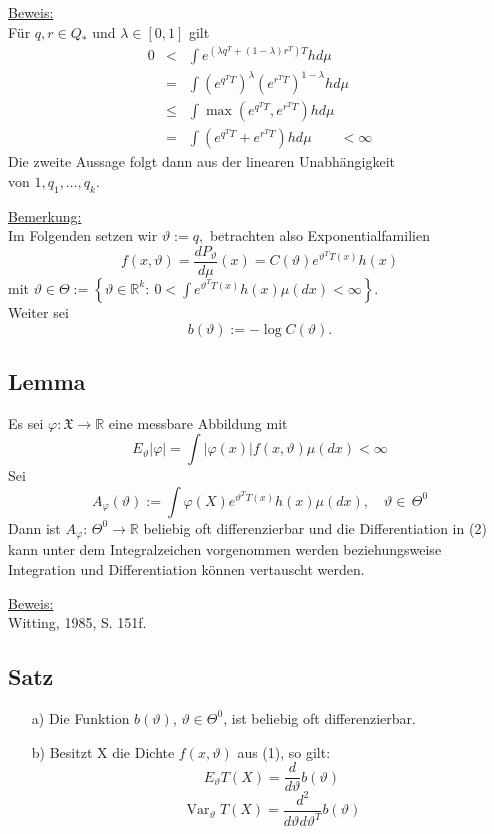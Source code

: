 \documentclass[a4paper,11pt,twoside,titlepage]{article}
\newcommand{\R}{{\mathbb R}}
\newcommand{\XX}{{\mathfrak X}} %
\DeclareMathOperator{\var}{Var}
\begin{document}
\underline{Beweis:}\\
F\"ur $q,r\in Q_*$ und $\lambda\in[0,1]$ gilt
\begin{eqnarray*}
  0 &<& \int e^{(\lambda q^{T} +(1-\lambda)r^{T} )T} h d\mu
   \\&=& \int \left( e^{q^{T}  T} \right)^\lambda \left(e^{r^{T}  T} \right)^{1-\lambda} h d\mu \\
   &\leq& \int \max\left( e^{q^{T}  T}, e^{r^{T} T} \right) h d\mu
   \\&=& \int \left( e^{q^{T}  T}+ e^{r^{T} T} \right) h d\mu  \qquad<\infty
\end{eqnarray*}
Die zweite Aussage folgt dann aus der linearen Unabhängigkeit\\ von $1,q_1,\ldots,q_k.$

\underline{Bemerkung:}\\
Im Folgenden setzen wir $\vartheta:=q,$ betrachten also Exponentialfamilien
\begin{equation}
f(x,\vartheta)=\frac{d P_\vartheta}{d\mu}(x)= C(\vartheta)
e^{\vartheta^{T}  T(x)} h(x)
\end{equation}
mit
$\vartheta\in\Theta:= \left\{\vartheta\in\R^k:~ 0<\int e^{\vartheta^{T} T(x)} h(x) \mu(dx) <\infty \right\}.$\\ Weiter sei
$$b(\vartheta):=-\log C(\vartheta). $$

\subsection{Lemma}
Es sei $\varphi:\XX\rightarrow \R$ eine messbare Abbildung mit
$$ E_\vartheta|\varphi|=\int |\varphi(x)| f(x,\vartheta) \mu(dx)<\infty$$
Sei
\begin{equation}
A_\varphi(\vartheta):=\int \varphi(X) e^{\vartheta^{T} T(x)} h(x) \mu(dx), \quad \vartheta\in \, \Theta^0
\end{equation}
Dann ist $A_\varphi: \, \Theta^0\rightarrow\R$ beliebig oft differenzierbar und die Differentiation in (2)  kann unter dem Integralzeichen vorgenommen werden beziehungsweise Integration und Differentiation k\"onnen vertauscht werden.

\underline{Beweis:}\\
Witting, 1985, S. 151f.

\subsection{Satz}
\begin{itemize}
\item[a) ]Die Funktion $b(\vartheta)$, $\vartheta\in\Theta^0$, ist beliebig oft differenzierbar.
\item[b) ]Besitzt X die Dichte $f(x,\vartheta)$ aus (1), so gilt:
\[E_\vartheta T(X)=\frac{d}{d\vartheta}b(\vartheta)\]
\[\var_\vartheta T(X)=\frac{d^2}{d\vartheta d\vartheta^T}b(\vartheta)\]
\end{itemize}
\end{document}
